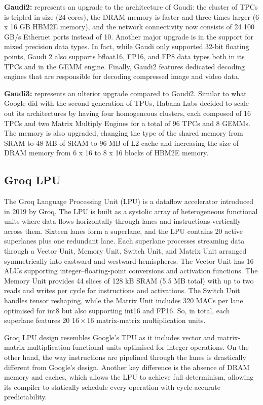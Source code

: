 \textbf{Gaudi2\cite{gaudi2}: } represents an upgrade to the architecture of Gaudi: the cluster of TPCs is tripled in size (24 cores), the DRAM memory is faster and three times larger (6 x 16 GB HBM2E memory), and the network connectivity now consists of 24 100 GB/s Ethernet ports instead of 10. Another major upgrade is in the support for mixed precision data types. In fact, while Gaudi only supported 32-bit floating points, Gaudi 2 also supports bfloat16, FP16, and FP8 data types both in its TPCs and in the GEMM engine. Finally, Gaudi2 features dedicated decoding engines that are responsible for decoding compressed image and video data.

\textbf{Gaudi3\cite{Kaplan2024}: } represents an ulterior upgrade compared to Gaudi2. Similar to what Google did with the second generation of TPUs, Habana Labs decided to scale out its architectures by having four homogeneous clusters, each composed of 16 TPCs and two Matrix Multiply Engines for a total of 96 TPCs and 8 GEMMs. The memory is also upgraded, changing the type of the shared memory from SRAM to 48 MB of SRAM to 96 MB of L2 cache and increasing the size of DRAM memory from 6 x 16 to 8 x 16 blocks of HBM2E memory.

\subsection{Groq LPU}

The Groq Language Processing Unit (LPU) \cite{Gwennap, Abts2022} is a dataflow accelerator introduced in 2019 by Groq.
The LPU is built as a systolic array of heterogeneous functional units where data flows horizontally through lanes and instructions vertically across them. Sixteen lanes form a superlane, and the LPU contains 20 active superlanes plus one redundant lane. Each superlane processes streaming data through a Vector Unit, Memory Unit, Switch Unit, and Matrix Unit arranged symmetrically into eastward and westward hemispheres. The Vector Unit has 16 ALUs supporting integer–floating-point conversions and activation functions. The Memory Unit provides 44 slices of 128 kB SRAM (5.5 MB total) with up to two reads and writes per cycle for instructions and activations. The Switch Unit handles tensor reshaping, while the Matrix Unit includes 320 MACs per lane optimised for int8 but also supporting int16 and FP16. So, in total, each superlane features 20 $16\times 16$ matrix-matrix multiplication units.

Groq LPU design resembles Google's TPU as it includes vector and matrix-matrix multiplication functional units optimised for integer operations. On the other hand, the way instructions are pipelined through the lanes is drastically different from Google's design. Another key difference is the absence of DRAM memory and caches, which allows the LPU to achieve full determinism, allowing its compiler to statically schedule every operation with cycle-accurate predictability.




